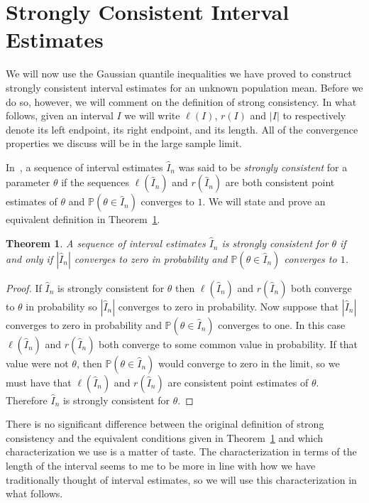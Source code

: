 \documentclass[12pt]{article}
\newcommand{\prob}[1]{\mathbb{P}(#1)}
\newtheorem{theorem}{Theorem}
\numberwithin{theorem}{section}
\begin{document}
\section{Strongly Consistent Interval Estimates}
\label{sec_conf_int}

We will now use the Gaussian quantile inequalities we have proved to construct strongly consistent interval estimates for an unknown population mean.  Before we do so, however, we will comment on the definition of strong consistency.  In what follows, given an interval $I$ we will write $\ell(I)$, $r(I)$ and $|I|$ to respectively denote its left endpoint, its right endpoint, and its length.  All of the convergence properties we discuss will be in the large sample limit.

In~\cite{rising2023orderPersp}, a sequence of interval estimates $\hat{I}_n$ was said to be \emph{strongly consistent} for a parameter $\theta$ if the sequences $\ell(\hat{I}_n)$ and $r(\hat{I}_n)$ are both consistent point estimates of $\theta$ and $\prob{\theta \in \hat{I}_n}$ converges to $1$.  We will state and prove an equivalent definition in Theorem~\ref{thm_def_equiv}.

\begin{theorem}
\label{thm_def_equiv}
A sequence of interval estimates $\hat{I}_n$ is strongly consistent for $\theta$ if and only if $|\hat{I}_n|$ converges to zero in probability and $\prob{\theta \in \hat{I}_n}$ converges to $1$.
\end{theorem}
\begin{proof}
If $\hat{I}_n$ is strongly consistent for $\theta$ then $\ell(\hat{I}_n)$ and $r(\hat{I}_n)$ both converge to $\theta$ in probability so $|\hat{I}_n|$ converges to zero in probability.  Now suppose that $|\hat{I}_n|$ converges to zero in probability and $\prob{\theta \in \hat{I}_n}$ converges to one.  In this case $\ell(\hat{I}_n)$ and $r(\hat{I}_n)$ both converge to some common value in probability.  If that value were not $\theta$, then $\prob{\theta \in \hat{I}_n}$ would converge to zero in the limit, so we must have that $\ell(\hat{I}_n)$ and $r(\hat{I}_n)$ are consistent point estimates of $\theta$.  Therefore $\hat{I}_n$ is strongly consistent for $\theta$.
\end{proof}

\noindent
There is no significant difference between the original definition of strong consistency and the equivalent conditions given in Theorem~\ref{thm_def_equiv} and which characterization we use is a matter of taste.  The characterization in terms of the length of the interval seems to me to be more in line with how we have traditionally thought of interval estimates, so we will use this characterization in what follows.
\end{document}
